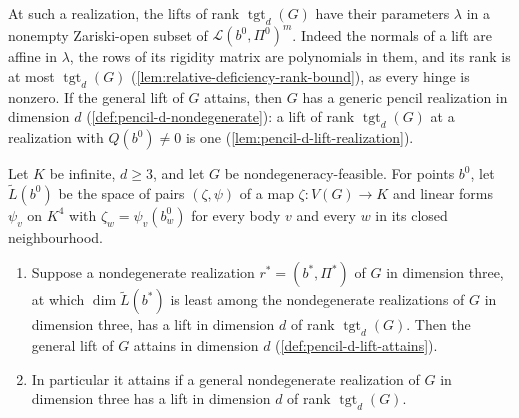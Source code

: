 At such a realization, the lifts of rank $\operatorname{tgt}_d(G)$ have
their parameters $\lambda$ in a nonempty Zariski-open subset of
$\mathcal{L}(b^0, \Pi^0)^m$. Indeed the normals of a lift are affine in
$\lambda$, the rows of its rigidity matrix are polynomials in them, and
its rank is at most $\operatorname{tgt}_d(G)$
(\cref{lem:relative-deficiency-rank-bound}), as every hinge is nonzero.
If the general lift of $G$ attains, then $G$ has a generic pencil
realization in dimension $d$ (\cref{def:pencil-d-nondegenerate}): a lift
of rank $\operatorname{tgt}_d(G)$ at a realization with $Q(b^0) \ne 0$ is
one (\cref{lem:pencil-d-lift-realization}).

\begin{lemma}
  \label{lem:pencil-d-lift-one-witness}
  \leanok
  Let $K$ be infinite, $d \ge 3$, and let $G$ be nondegeneracy-feasible.
  For points $b^0$, let $\widetilde L(b^0)$ be the space of pairs
  $(\zeta, \psi)$ of a map $\zeta \colon V(G) \to K$
  and linear forms $\psi_v$ on $K^4$ with $\zeta_w = \psi_v(b^0_w)$ for
  every body $v$ and every $w$ in its closed neighbourhood.
  \begin{enumerate}
    \item Suppose a nondegenerate realization $r^* = (b^*, \Pi^*)$ of $G$
      in dimension three, at which $\dim \widetilde L(b^*)$ is least among
      the nondegenerate realizations of $G$ in dimension three, has a lift
      in dimension $d$ of rank $\operatorname{tgt}_d(G)$. Then the general
      lift of $G$ attains in dimension $d$
      (\cref{def:pencil-d-lift-attains}).
    \item In particular it attains if a general nondegenerate realization
      of $G$ in dimension three has a lift in dimension $d$ of rank
      $\operatorname{tgt}_d(G)$.
  \end{enumerate}
\end{lemma}
